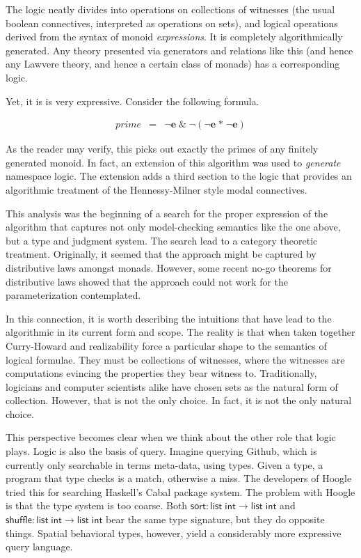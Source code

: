 The logic neatly divides into operations on collections of witnesses
(the usual boolean connectives, interpreted as operations on sets),
and logical operations derived from the syntax of monoid
\emph{expressions}. It is completely algorithmically generated. Any
theory presented via generators and relations like this (and hence any
Lawvere theory, and hence a certain class of monads) has a
corresponding logic.

Yet, it is is very expressive. Consider the following formula.

\begin{eqnarray*}
  prime & = & \neg \mathbf{e} \; \& \; \neg (\neg \mathbf{e} \; \mathbf{*}\; \neg \mathbf{e})
\end{eqnarray*}

As the reader may verify, this picks out exactly the primes of any
finitely generated monoid. In fact, an extension of this algorithm was
used to \emph{generate} namespace logic. The extension adds a third
section to the logic that provides an algorithmic treatment of the
Hennessy-Milner style modal connectives.

This analysis was the beginning of a search for the proper expression
of the algorithm that captures not only model-checking semantics like
the one above, but a type and judgment system. The search lead to a
category theoretic treatment. Originally, it seemed that the approach
might be captured by distributive laws amongst monads. However, some
recent no-go theorems for distributive laws showed that the approach
could not work for the parameterization contemplated.

In this connection, it is worth describing the intuitions that have
lead to the algorithmic in its current form and scope. The reality is
that when taken together Curry-Howard and realizability force a
particular shape to the semantics of logical formulae. They must be
collections of witnesses, where the witnesses are computations
evincing the properties they bear witness to. Traditionally, logicians
and computer scientists alike have chosen sets as the natural form of
collection. However, that is not the only choice. In fact, it is not
the only natural choice.

This perspective becomes clear when we think about the other role that
logic plays. Logic is also the basis of query. Imagine querying
Github, which is currently only searchable in terms meta-data, using
types. Given a type, a program that type checks is a match, otherwise
a miss. The developers of Hoogle tried this for searching Haskell's
Cabal package system. The problem with Hoogle is that the type system
is too coarse. Both $\mathsf{sort} : \mathsf{list}\; \mathsf{int} \to \mathsf{list} \; \mathsf{int}$ and $\mathsf{shuffle} : \mathsf{list}\; \mathsf{int} \to \mathsf{list} \; \mathsf{int}$ bear the same type signature, but they do opposite
things. Spatial behavioral types, however, yield a considerably more
expressive query language.

